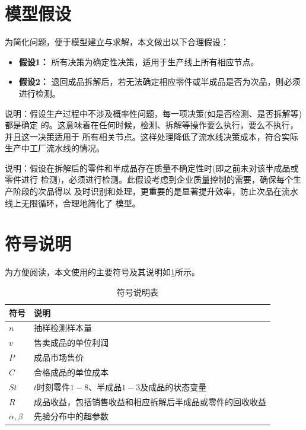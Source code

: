 \documentclass[withoutpreface,notoc]{cumcmthesis}
\begin{document}
	\section{模型假设}

	为简化问题，便于模型建立与求解，本文做出以下合理假设：





	\begin{itemize}[itemindent=2em]
		\item \textbf{假设1：} 所有决策为确定性决策，适用于生产线上所有相应节点。
		\item \textbf{假设2：} 退回成品拆解后，若无法确定相应零件或半成品是否为次品，则必须进行检测。
	\end{itemize}

	说明：假设生产过程中不涉及概率性问题，每一项决策(如是否检测、是否拆解等)都是确定
的。这意味着在任何时候，检测、拆解等操作要么执行，要么不执行，并且这一决策适用于
所有相关节点。这样处理降低了流水线决策成本，符合实际生产中工厂流水线的情况。

说明：假设在拆解后的零件和半成品存在质量不确定性时(即之前未对该半成品或零件进行
检测)，必须进行检测。此假设考虑到企业质量控制的需要，确保每个生产阶段的次品得以
及时识别和处理，更重要的是显著提升效率，防止次品在流水线上无限循环，合理地简化了
模型。
	
	\section{符号说明}

为方便阅读，本文使用的主要符号及其说明如\cref{tab:符号说明}所示。
\begin{table}[H]
    \centering
    \caption{符号说明表}
    \label{tab:符号说明}
    \begin{tabularx}{\textwidth}{@{}>{\centering}p{3.2cm}>{\centering\arraybackslash}X@{}}
        \toprule
        \textbf{符号} & \textbf{说明} \\
        \midrule
        $n$      & 抽样检测样本量 \\
        $v$      & 售卖成品的单位利润 \\
        $P$      & 成品市场售价 \\
        $C$      & 合格成品的单位成本 \\
        $St$     & $t$时刻零件$1-8$、半成品$1-3$及成品的状态变量 \\
        $R$      & 成品收益，包括销售收益和相应拆解后半成品或零件的回收收益 \\
        $\alpha, \beta$ & 先验分布中的超参数 \\
        \bottomrule
    \end{tabularx}
\end{table}
\end{document}
